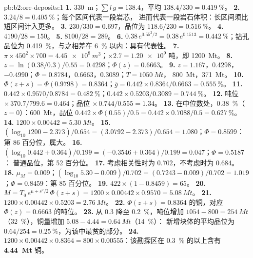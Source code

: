 \begin{solution}{pb:b2:ore-deposits:1}
\textbf{1.} \qty{330}{m}；$\sum l\,g = 138.4$，平均 $138.4/330 = \qty{0.419}{\percent}$。
\textbf{2.} $3.24/8 = \qty{0.405}{\percent}$；每个区间代表一段岩芯，
进而代表一段岩石体积：长区间须比短区间计入更多。
\textbf{3.} $230/330 = 0.697$，品位为 $118.6/230 = \qty{0.516}{\percent}$。
\textbf{4.} $4190/28 = 150$。
\textbf{5.} $8100/28 = 289$。
\textbf{6.} $0.38\,e^{0.55^2/2} = 0.38\,e^{0.1513} = \qty{0.442}{\percent}$；钻孔
品位为 \qty{0.419}{\percent}，与之相差在 \qty{6}{\percent} 以内：具有代表性。
\textbf{7.} $\pi \times 450^2 \times 700 = \qty{4.45e8}{m^3}$；$\times 2.7 = \num{1.20e9}$ 吨，即
\qty{1200}{Mt}。
\textbf{8.} $z = \ln(0.38/0.3)/0.55 = 0.4298$；$\Phi(z) = 0.6663$。
\textbf{9.} $z = 1.167$，0.4298，$-0.4990$；$\Phi = 0.8784$，0.6663，0.3089；$T = \qty{1050}{Mt}$，
\qty{800}{Mt}，\qty{371}{Mt}。
\textbf{10.} $\Phi(z + s) = \Phi(0.9798) = 0.8364$；$\bar g = 0.442 \times 0.8364/0.6663 =
\qty{0.555}{\percent}$。
\textbf{11.} $0.442 \times 0.9570/0.8784 = \qty{0.482}{\percent}$；$0.442 \times 0.5203/0.3089 =
\qty{0.744}{\percent}$。
\textbf{12.} 吨位 $\times\, 370.7/799.6 = 0.464$；品位 $\times\, 0.744/0.555 = 1.34$。
\textbf{13.} 在中位数处，\qty{0.38}{\percent}（$z = 0$）：\qty{600}{Mt}，品位 $0.442 \times
\Phi(0.55)/0.5 = 0.442 \times 0.7088/0.5 = \qty{0.627}{\percent}$。
\textbf{14.} $1200 \times 0.00442 = \qty{5.30}{Mt}$。
\textbf{15.} $(\log_{10} 1200 - 2.373)/0.654 = (3.0792 - 2.373)/0.654 = 1.080$；$\Phi = 0.8599$：
第 86 百分位，属大。
\textbf{16.} $(\log_{10} 0.442 + 0.364)/0.199 = (-0.3546 + 0.364)/0.199 = 0.047$；$\Phi = 0.5187$：
普通品位，第 52 百分位。
\textbf{17.} 考虑相关性时为 0.702，不考虑时为 0.684。
\textbf{18.} $\mu_M = 0.009$；$(\log_{10} 5.30 - 0.009)/0.702 = (0.7243 - 0.009)/0.702 = 1.019$；$\Phi =
0.8459$：第 85 百分位。
\textbf{19.} $422 \times (1 - 0.8459) = 65$。
\textbf{20.} $M = T_0\,e^{\mu + s^2/2}\,\Phi(z + s) = 1200 \times 0.00442 \times 0.9570 =
\qty{5.08}{Mt}$。
\textbf{21.} $1200 \times 0.00442 \times 0.5203 = \qty{2.76}{Mt}$。
\textbf{22.} $\Phi(z + s) = 0.8364$ 的铜，对应 $\Phi(z) = 0.6663$ 的吨位。
\textbf{23.} 从 0.3 降至 \qty{0.2}{\percent}，吨位增加 $1054 - 800 = \qty{254}{Mt}$
（\qty{32}{\percent}），铜量增加 $5.08 - 4.44 = \qty{0.64}{Mt}$（\qty{14}{\percent}）：
新增块体的平均品位为 $0.64/254 = \qty{0.25}{\percent}$，为该中最贫的部分。
\textbf{24.} $1200 \times 0.00442 \times 0.8364 = 800 \times 0.00555$：该勘探区在 \qty{0.3}{\percent} 的以上含有
\textbf{\qty[text-series-to-math=true]{4.44}{Mt}} 铜。
\end{solution}
